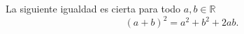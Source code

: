 \documentclass{article}
\begin{document}
La siguiente igualdad es cierta para todo $a,b\in \mathbb{R}$
\[
(a+b)^2=a^2+b^2+2ab.
\]
\end{document}
